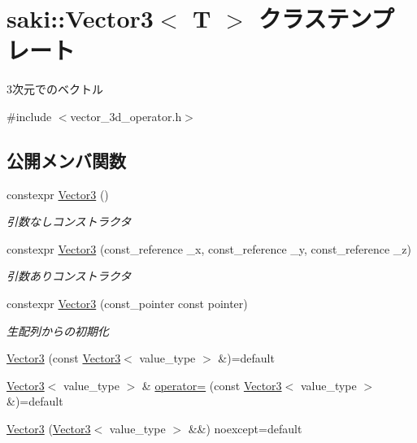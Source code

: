 \hypertarget{classsaki_1_1_vector3}{}\section{saki\+:\+:Vector3$<$ T $>$ クラステンプレート}
\label{classsaki_1_1_vector3}


3次元でのベクトル  




{\ttfamily \#include $<$vector\+\_\+3d\+\_\+operator.\+h$>$}

\subsection*{公開メンバ関数}
\begin{DoxyCompactItemize}
\item 
constexpr \mbox{\hyperlink{classsaki_1_1_vector3_a8617fe1a8d279c9673628728a0c5e5c6}{Vector3}} ()
\begin{DoxyCompactList}\small\item\em 引数なしコンストラクタ \end{DoxyCompactList}\item 
constexpr \mbox{\hyperlink{classsaki_1_1_vector3_a02ad4760c906e6844a815be0dbf9aa55}{Vector3}} (const\+\_\+reference \+\_\+x, const\+\_\+reference \+\_\+y, const\+\_\+reference \+\_\+z)
\begin{DoxyCompactList}\small\item\em 引数ありコンストラクタ \end{DoxyCompactList}\item 
constexpr \mbox{\hyperlink{classsaki_1_1_vector3_a5771046eb72964a7022c411eddc543c2}{Vector3}} (const\+\_\+pointer const pointer)
\begin{DoxyCompactList}\small\item\em 生配列からの初期化 \end{DoxyCompactList}\item 
\mbox{\hyperlink{classsaki_1_1_vector3_aa77d37d18ad52e9233a47ecc099c813c}{Vector3}} (const \mbox{\hyperlink{classsaki_1_1_vector3}{Vector3}}$<$ value\+\_\+type $>$ \&)=default
\item 
\mbox{\hyperlink{classsaki_1_1_vector3}{Vector3}}$<$ value\+\_\+type $>$ \& \mbox{\hyperlink{classsaki_1_1_vector3_ad26b48b9e32f5ecf34d15b366bccd3ef}{operator=}} (const \mbox{\hyperlink{classsaki_1_1_vector3}{Vector3}}$<$ value\+\_\+type $>$ \&)=default
\item 
\mbox{\hyperlink{classsaki_1_1_vector3_adc58d81fc6c31626460d9f02e6c768c2}{Vector3}} (\mbox{\hyperlink{classsaki_1_1_vector3}{Vector3}}$<$ value\+\_\+type $>$ \&\&) noexcept=default

\end{DoxyCompactItemize}
